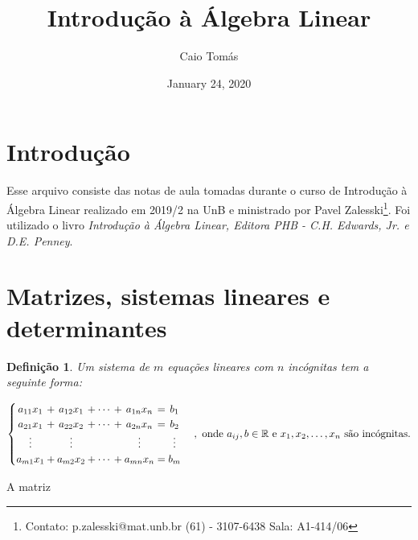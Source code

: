 \documentclass{article}
\title{Introdução à Álgebra Linear}
\author{Caio Tomás}
\date{January 24, 2020}
\newtheorem*{definition}{Definição}
\begin{document}
\maketitle
\tableofcontents
\newpage
\section{Introdução}
Esse arquivo consiste das notas de aula tomadas durante o curso de Introdução à Álgebra Linear realizado em 2019/2 na UnB e ministrado por Pavel Zalesski\footnote{Contato: p.zalesski@mat.unb.br (61) - 3107-6438 Sala: A1-414/06}. Foi utilizado o livro \textit{Introdução à Álgebra Linear, Editora PHB - C.H. Edwards, Jr. e D.E. Penney}. 


\section{Matrizes, sistemas lineares e determinantes} 
\begin{definition}
	Um sistema de $m$ equações lineares com $n$ incógnitas tem a seguinte forma:
\end{definition}
\begin{align}
	\begin{cases}
		\begin{array}{*{9}{@{}c@{}}}
		a_{11}x_1 & {}+{} & a_{12}x_1 &{}+{} & \cdots & {}+{} & a_{1n}x_n & {}\mathrel{=}{} & b_1 \\
		a_{21}x_1 & + & a_{22}x_2 & + & \cdots & + & a_{2n}x_n & = & b_2 \\
		\vdots    &   & \vdots    &   &        &   & \vdots    &   & \vdots \\
		a_{m1}x_1 & + & a_{m2}x_2 & + & \cdots & + & a_{mn}x_n & = & b_m \\
		\end{array}
	\end{cases}, \text{ onde $a_{ij}, b\in\mathbb{R}$ e $x_1, x_2, \dots, x_n$ são incógnitas.}
\end{align}
\par\vspace{0.3cm} A matriz
\end{document}
